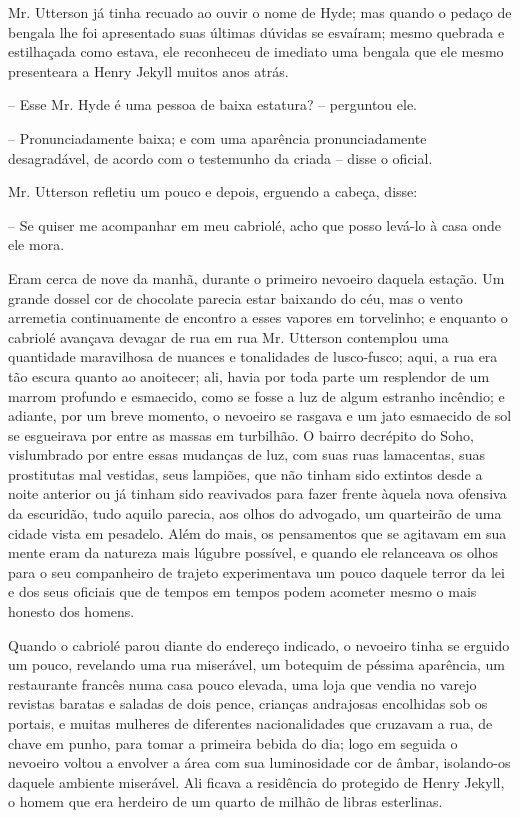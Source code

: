 Mr. Utterson já tinha recuado ao ouvir o nome de Hyde; mas quando o
pedaço de bengala lhe foi apresentado suas últimas dúvidas se esvaíram;
mesmo quebrada e estilhaçada como estava, ele reconheceu de imediato
uma bengala que ele mesmo presenteara a Henry Jekyll muitos anos atrás.

-- Esse Mr. Hyde é uma pessoa de baixa estatura? -- perguntou ele.

-- Pronunciadamente baixa; e com uma aparência pronunciadamente
desagradável, de acordo com o testemunho da criada -- disse o oficial.

Mr.  Utterson refletiu um pouco e depois, erguendo a cabeça, disse: 

-- Se quiser me acompanhar em meu cabriolé, acho que posso levá-lo à
casa onde ele mora.

Eram cerca de nove da manhã, durante o primeiro nevoeiro daquela
estação.  Um grande dossel cor de chocolate parecia estar baixando do
céu, mas o vento arremetia continuamente de encontro a esses vapores em
torvelinho; e enquanto o cabriolé avançava devagar de rua em rua Mr.
Utterson contemplou uma quantidade maravilhosa de nuances e tonalidades
de lusco-fusco; aqui, a rua era tão escura quanto ao anoitecer; ali,
havia por toda parte um resplendor de um marrom profundo e esmaecido,
como se fosse a luz de algum estranho incêndio; e adiante, por um breve
momento, o nevoeiro se rasgava e um jato esmaecido de sol se esgueirava
por entre as massas em turbilhão.  O bairro decrépito do Soho,
vislumbrado por entre essas mudanças de luz, com suas ruas lamacentas,
suas prostitutas mal vestidas, seus lampiões, que não tinham sido
extintos desde a noite anterior ou já tinham sido reavivados para fazer
frente àquela nova ofensiva da escuridão, tudo aquilo parecia, aos
olhos do advogado, um quarteirão de uma cidade vista em pesadelo.  Além
do mais, os pensamentos que se agitavam em sua mente eram da natureza
mais lúgubre possível, e quando ele relanceava os olhos para o seu
companheiro de trajeto experimentava um pouco daquele terror da lei e
dos seus oficiais que de tempos em tempos podem acometer mesmo o mais
honesto dos homens. 

Quando o cabriolé parou diante do endereço indicado, o nevoeiro tinha se
erguido um pouco, revelando uma rua miserável, um botequim de péssima
aparência, um restaurante francês numa casa pouco elevada, uma loja que
vendia no varejo revistas baratas e saladas de dois pence, crianças
andrajosas encolhidas sob os portais, e muitas mulheres de diferentes
nacionalidades que cruzavam a rua, de chave em punho, para tomar a
primeira bebida do dia; logo em seguida o nevoeiro voltou a envolver a
área com sua luminosidade cor de âmbar, isolando-os daquele ambiente
miserável.  Ali ficava a residência do protegido de Henry Jekyll, o
homem que era herdeiro de um quarto de milhão de libras esterlinas.

